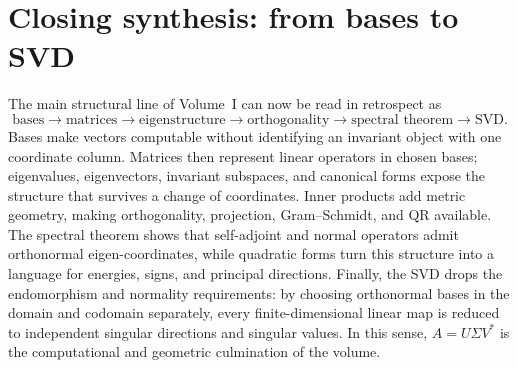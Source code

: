 \section*{Closing synthesis: from bases to SVD}
The main structural line of Volume~I can now be read in retrospect as
\[
\boxed{
\text{bases}
\longrightarrow
\text{matrices}
\longrightarrow
\text{eigenstructure}
\longrightarrow
\text{orthogonality}
\longrightarrow
\text{spectral theorem}
\longrightarrow
\text{SVD}.}
\]
Bases make vectors computable without identifying an invariant object with one
coordinate column. Matrices then represent linear operators in chosen bases;
eigenvalues, eigenvectors, invariant subspaces, and canonical forms expose the
structure that survives a change of coordinates. Inner products add metric
geometry, making orthogonality, projection, Gram--Schmidt, and QR available.
The spectral theorem shows that self-adjoint and normal operators admit
orthonormal eigen-coordinates, while quadratic forms turn this structure into a
language for energies, signs, and principal directions. Finally, the SVD drops
the endomorphism and normality requirements: by choosing orthonormal bases in
the domain and codomain separately, every finite-dimensional linear map is
reduced to independent singular directions and singular values. In this sense,
\(A=U\Sigma V^*\) is the computational and geometric culmination of the volume.
